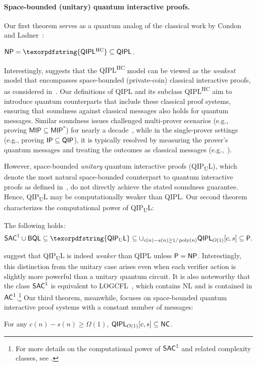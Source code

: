 \documentclass[11pt, a4paper]{article}
\numberwithin{equation}{section}
\numberwithin{figure}{section}
\newcommand{\Ptime}{\textnormal{\textsf{P}}\xspace}
\newcommand{\NP}{\textnormal{\textsf{NP}}\xspace}
\newcommand{\IP}{\textnormal{\textsf{IP}}\xspace}
\newcommand{\QIP}{\textnormal{\textsf{QIP}}\xspace}
\newcommand{\QIPL}{\textnormal{\textsf{QIPL}}\xspace}
\newcommand{\QIPUL}{\texorpdfstring{\textnormal{\textsf{QIP}\textsubscript{\textnormal{U}}\textsf{L}}}\xspace}
\newcommand{\QIPLHC}{\texorpdfstring{\textnormal{\textsf{QIPL}\textsuperscript{\textnormal{HC}}}}\xspace}
\newcommand{\BQL}{\textnormal{\textsf{BQL}}\xspace}
\newcommand{\SAC}{\textnormal{\textsf{SAC}}\xspace}
\newcommand{\AC}{\textnormal{\textsf{AC}}\xspace}
\newcommand{\NC}{\textnormal{\textsf{NC}}\xspace}
\newcommand{\NL}{\textnormal{\textsf{NL}}\xspace}
\newcommand{\LOGCFL}{\textnormal{\textsf{LOGCFL}}\xspace}
\DeclareMathOperator\poly{poly}
\begin{document}
\paragraph{Space-bounded (unitary) quantum interactive proofs.} Our first theorem serves as a quantum analog of the classical work by Condon and Ladner~\cite{CL95}:
\begin{theorem}
    \label{thm:QIPL-eq-NP-informal}
    $\NP = \QIPLHC \subseteq \QIPL$.
\end{theorem}

Interestingly,  suggests that the \QIPLHC{} model can be viewed as the \textit{weakest} model that encompasses space-bounded (private-coin) classical interactive proofs, as considered in~\cite{CL95}. Our definitions of \QIPL{} and its subclass \QIPLHC{} aim to introduce quantum counterparts that include these classical proof systems, ensuring that soundness against classical messages also holds for quantum messages. 
Similar soundness issues challenged multi-prover scenarios (e.g., proving $\mathsf{MIP} \subseteq \mathsf{MIP^*}$) for nearly a decade~\cite{CHTW04,IV12}, while in the single-prover settings (e.g., proving $\IP \subseteq \QIP$), it is typically resolved by measuring the prover's quantum messages and treating the outcomes as classical messages (e.g.,~\cite[Claim 1]{AN02}). 

However, space-bounded \textit{unitary} quantum interactive proofs (\QIPUL{}), which denote the most natural space-bounded counterpart to quantum interactive proofs as defined in~\cite{KW00,Wat03}, do not directly achieve the stated soundness guarantee. Hence, \QIPUL{} may be computationally weaker than \QIPL{}. 
Our second theorem characterizes the computational power of \QIPUL{}: 
\begin{theorem}
    \label{thm:QIPUL-bounds-informal} The following holds\emph{:}
    \[\SAC^1 \cup \BQL \subseteq \QIPUL \subseteq \cup_{c(n)-s(n) \geq 1/\poly(n)} \QIPL_{O(1)}[c,s] \subseteq \Ptime.\] 
\end{theorem}

 suggest that \QIPUL{} is indeed \textit{weaker} than \QIPL{} unless $\Ptime = \NP$. Interestingly, this distinction from the unitary case arises even when each verifier action is slightly more powerful than a unitary quantum circuit.
It is also noteworthy that the class $\SAC^1$ is equivalent to \LOGCFL{}~\cite{Venkateswaran87}, which contains \NL{} and is contained in $\AC^1$.\footnote{For more details on the computational power of $\SAC^1$ and related complexity classes, see . }
Our third theorem, meanwhile, focuses on space-bounded quantum interactive proof systems with a constant number of messages: 
\begin{theorem} 
    \label{thm:QIPLconst-informal}
    For any $c(n)-s(n) \geq \Omega(1)$, $\QIPL_{O(1)}[c,s] \subseteq \NC$. 
\end{theorem}
\end{document}
